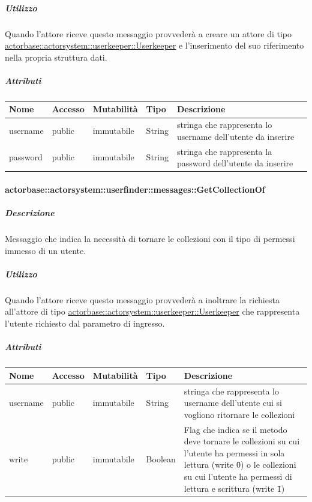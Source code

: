 \documentclass{scalatekids-article}
\begin{document}
\subparagraph{Utilizzo}
Quando l'attore riceve questo messaggio provvederà a creare un attore di tipo \hyperref[sec:actorbase::actorsystem::userkeeper::Userkeeper]{actorbase::\allowbreak{}actorsystem::\allowbreak{}userkeeper::\allowbreak{}Userkeeper}
e l'inserimento del suo riferimento nella propria struttura dati.

\subparagraph{Attributi}
\begin{tabular}{| p{3cm} | p{1.5cm} | p{2cm} | p{2cm} | p{8.5cm} |}
  \hline
  Nome & Accesso & Mutabilità & Tipo & Descrizione\\
  \hline
  username & public & immutabile & String & stringa che rappresenta lo username dell'utente da inserire \\
  \hline
  password & public & immutabile & String & stringa che rappresenta la password dell'utente da inserire \\
  \hline
\end{tabular}

\paragraph{actorbase::actorsystem::userfinder::messages::GetCollectionOf}
\label{sec:actorbase::actorsystem::userfinder::messages::GetCollectionOf}

\subparagraph{Descrizione}
Messaggio che indica la necessità di tornare le collezioni con il tipo di permessi immesso di un utente.

\subparagraph{Utilizzo}
Quando l'attore riceve questo messaggio provvederà a inoltrare la richiesta all'attore di tipo \hyperref[sec:actorbase::actorsystem::userkeeper::Userkeeper]{actorbase::\allowbreak{}actorsystem::\allowbreak{}userkeeper::\allowbreak{}Userkeeper}
che rappresenta l'utente richiesto dal parametro di ingresso.

\subparagraph{Attributi}
\begin{tabular}{| p{3cm} | p{1.5cm} | p{2cm} | p{2cm} | p{8.5cm} |}
  \hline
  Nome & Accesso & Mutabilità & Tipo & Descrizione\\
  \hline
  username & public & immutabile & String & stringa che rappresenta lo username dell'utente cui si vogliono ritornare le collezioni \\
  \hline
  write & public & immutabile & Boolean & Flag che indica se il metodo deve tornare le collezioni su cui l'utente ha permessi in sola lettura (write \= 0) o le collezioni su cui l'utente ha permessi di lettura e scrittura (write \= 1) \\
  \hline
\end{tabular}
\end{document}
